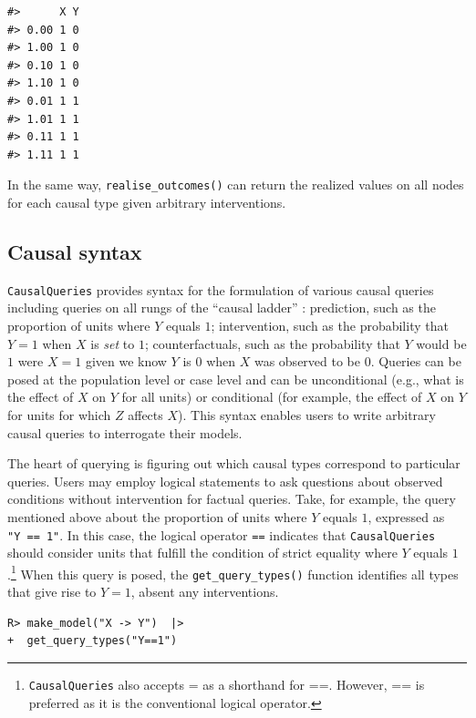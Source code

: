\documentclass[
  11pt,
  article]{jss}
\begin{document}
\begin{verbatim}
#>      X Y
#> 0.00 1 0
#> 1.00 1 0
#> 0.10 1 0
#> 1.10 1 0
#> 0.01 1 1
#> 1.01 1 1
#> 0.11 1 1
#> 1.11 1 1
\end{verbatim}

In the same way, \texttt{realise\_outcomes()} can return the realized
values on all nodes for each causal type given arbitrary interventions.

\subsection{Causal syntax}\label{sec-syntax}

\texttt{CausalQueries} provides syntax for the formulation of various
causal queries including queries on all rungs of the ``causal ladder''
\citep{pearl_causality_2009}: prediction, such as the proportion of
units where \(Y\) equals \(1\); intervention, such as the probability
that \(Y = 1\) when \(X\) is \emph{set} to \(1\); counterfactuals, such
as the probability that \(Y\) would be \(1\) were \(X = 1\) given we
know \(Y\) is \(0\) when \(X\) was observed to be \(0\). Queries can be
posed at the population level or case level and can be unconditional
(e.g., what is the effect of \(X\) on \(Y\) for all units) or
conditional (for example, the effect of \(X\) on \(Y\) for units for
which \(Z\) affects \(X\)). This syntax enables users to write arbitrary
causal queries to interrogate their models.

The heart of querying is figuring out which causal types correspond to
particular queries. Users may employ logical statements to ask questions
about observed conditions without intervention for factual queries.
Take, for example, the query mentioned above about the proportion of
units where \(Y\) equals \(1\), expressed as \texttt{"Y\ ==\ 1"}. In
this case, the logical operator \texttt{==} indicates that
\texttt{CausalQueries} should consider units that fulfill the condition
of strict equality where \(Y\) equals \(1\).\footnote{\texttt{CausalQueries}
  also accepts = as a shorthand for ==. However, == is preferred as it
  is the conventional logical operator.} When this query is posed, the
\texttt{get\_query\_types()} function identifies all types that give
rise to \(Y=1\), absent any interventions.

\begin{verbatim}
R> make_model("X -> Y")  |> 
+  get_query_types("Y==1")
\end{verbatim}
\end{document}
